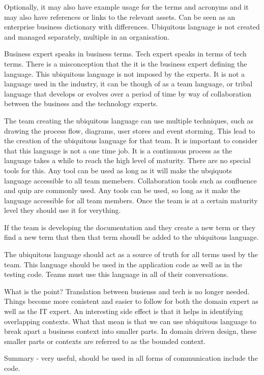 Optionally, it may also have example usage for the terms and acronyms and it may also have references or links to the relevant assets.
Can be seen as an enterprise business dictionary with differences.
Ubiquitous language is not created and managed separately, multiple in an organisation.

Business expert speaks in business terms.
Tech expert speaks in terms of tech terms.
There is a misconception that the it is the business expert defining the language.
This ubiquitous language is not imposed by the experts.
It is not a language used in the industry, it can be though of as a team language, or tribal language that develops or evolves over a period of time by way of collaboration between the business and the technology experts.

The team creating the ubiquitous language can use multiple techniques, such as drawing the process flow, diagrams, user stores and event storming.
This lead to the creation of the ubiquitous language for that team.
It is important to consider that this language is not a one time job.
It is a continuous process as the language takes a while to reach the high level of maturity.
There are no special tools for this.
Any tool can be used as long as it will make the ubqiquots language accessible to all team memebers.
Collaboration tools such as confluence and quip are commonly used.
Any tools can be used, so long as it make the language accessible for all team members. Once the team is at a certain maturity level they should use it for verything.

If the team is developing the documentation and they create a new term or they find a new term that then that term shoudl be added to the ubiquitous language.

The ubiquitous language should act as a source of truth for all terms used by the team.
This language should be used in the application code as well as in the testing code.
Teams must use this language in all of their conversations.

What is the point?
Translation between busienss and tech is no longer needed.
Things become more conistent and easier to follow for both the domain expert as well as the IT expert.
An interesting side effect is that it helps in identifying overlapping contexts.
What that mean is that we can use ubiquitous language to break apart a business context into smaller parts.
In domain driven design, these smaller parts or contexts are referred to as the bounded context.

Summary - very useful, should be used in all forms of communication include the code.

